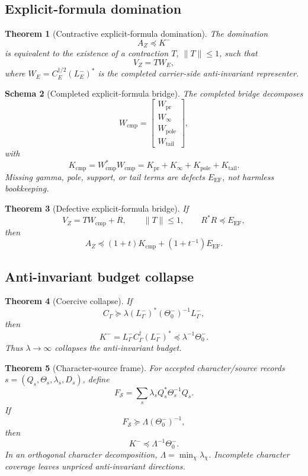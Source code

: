 \documentclass[11pt]{article}
\newtheorem{theorem}{Theorem}[section]
\newtheorem{schema}[theorem]{Schema}
\newcommand{\EF}{\mathrm{EF}}
\newcommand{\cmp}{\mathrm{cmp}}
\newcommand{\pr}{\mathrm{pr}}
\newcommand{\tail}{\mathrm{tail}}
\begin{document}
\subsection{Explicit-formula domination}
\begin{theorem}[Contractive explicit-formula domination]
The domination
\[
  A_Z\preceq K^-
\]
is equivalent to the existence of a contraction \(T\), \(\|T\|\le1\), such that
\[
  V_Z=TW_E,
\]
where \(W_E=C_E^{\dagger/2}(L_E^-)^*\) is the completed carrier-side anti-invariant representer.
\end{theorem}

\begin{schema}[Completed explicit-formula bridge]
The completed bridge decomposes
\[
  W_\cmp=\begin{bmatrix}W_\pr\\W_\infty\\W_\mathrm{pole}\\W_\tail\end{bmatrix},
\]
with
\[
  K_\cmp=W_\cmp^*W_\cmp=K_\pr+K_\infty+K_\mathrm{pole}+K_\tail.
\]
Missing gamma, pole, support, or tail terms are defects \(E_{\EF}\), not harmless bookkeeping.
\end{schema}

\begin{theorem}[Defective explicit-formula bridge]
If
\[
  V_Z=TW_\cmp+R,
  \qquad \|T\|\le1,
  \qquad R^*R\preceq E_{\EF},
\]
then
\[
  A_Z\preceq(1+t)K_\cmp+(1+t^{-1})E_{\EF}.
\]
\end{theorem}

\subsection{Anti-invariant budget collapse}
\begin{theorem}[Coercive collapse]
If
\[
  C_\Gamma\succeq \lambda (L^-_\Gamma)^*(\Theta_0^-)^{-1}L^-_\Gamma,
\]
then
\[
  K^-=L^-_\Gamma C_\Gamma^\dagger(L^-_\Gamma)^*\preceq\lambda^{-1}\Theta_0^-.
\]
Thus \(\lambda\to\infty\) collapses the anti-invariant budget.
\end{theorem}

\begin{theorem}[Character-source frame]
For accepted character/source records \(s=(Q_s,\Theta_s,\lambda_s,D_s)\), define
\[
  F_{\mathcal S}=\sum_s\lambda_s Q_s^*\Theta_s^{-1}Q_s.
\]
If
\[
  F_{\mathcal S}\succeq \Lambda(\Theta_0^-)^{-1},
\]
then
\[
  K^-\preceq\Lambda^{-1}\Theta_0^-.
\]
In an orthogonal character decomposition, \(\Lambda=\min_\chi\lambda_\chi\).  Incomplete character coverage leaves unpriced anti-invariant directions.
\end{theorem}
\end{document}

